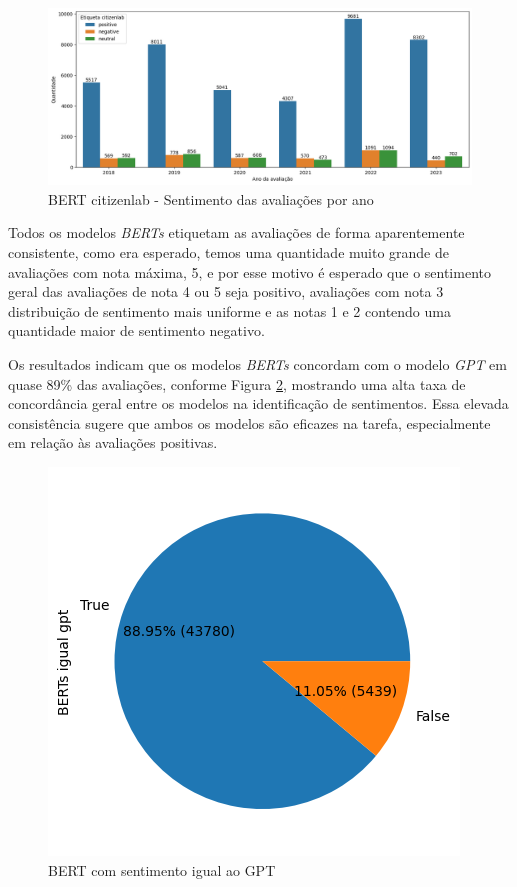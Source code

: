\begin{figure}
	\centering
	\includegraphics[width=1\textwidth]{figs/bert/classificacao_citizenlab.png}
	\caption{BERT citizenlab - Sentimento das avaliações por ano}
	\label{img:sentimento_citizenlab}
\end{figure}


Todos os modelos \textit{BERTs} etiquetam as avaliações de forma aparentemente consistente, como era esperado, temos uma quantidade muito grande de avaliações com nota máxima, 5, e por esse motivo é esperado que o sentimento geral das avaliações de nota 4 ou 5 seja positivo, avaliações com nota 3 distribuição de sentimento mais uniforme e as notas 1 e 2 contendo uma quantidade maior de sentimento negativo.

Os resultados indicam que os modelos \textit{BERTs} concordam com o modelo \textit{GPT} em quase 89\% das avaliações, conforme Figura \ref{img:bert_vs_gpt}, mostrando uma alta taxa de concordância geral entre os modelos na identificação de sentimentos. Essa elevada consistência sugere que ambos os modelos são eficazes na tarefa, especialmente em relação às avaliações positivas.

\begin{figure}
	\centering
	\includegraphics{figs/bert/vs_gpt.png}
	\caption{BERT com sentimento igual ao GPT}
	\label{img:bert_vs_gpt}
\end{figure}

